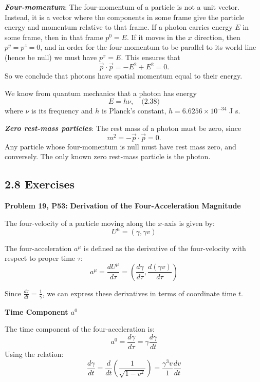 \documentclass[12pt]{book}
\begin{document}
        \textit{\textbf{Four-momentum}}:
        The four-momentum of a particle is not a unit vector. Instead, it is a vector where the components in some frame give the particle energy and momentum relative to that frame. If a photon carries energy \( E \) in some frame, then in that frame \( p^0 = E \). If it moves in the \( x \) direction, then \( p^y = p^z = 0 \), and in order for the four-momentum to be parallel to its world line (hence be null) we must have \( p^x = E \). This ensures that
        \[
        \vec{p} \cdot \vec{p} = -E^2 + E^2 = 0.
        \]
        So we conclude that photons have spatial momentum equal to their energy.
        
        We know from quantum mechanics that a photon has energy
        \[
        E = h\nu, \quad \text{(2.38)}
        \]
        where \( \nu \) is its frequency and \( h \) is Planck’s constant, \( h = 6.6256 \times 10^{-34} \) J s.

        \textit{\textbf{Zero rest-mass particles}}:
        The rest mass of a photon must be zero, since
        \[
        m^2 = -\vec{p} \cdot \vec{p} = 0.
        \]
        Any particle whose four-momentum is null must have rest mass zero, and conversely. The only known zero rest-mass particle is the photon.

        \subsection{2.8 Exercises}
        \textbf{Problem 19, P53:}
            \textbf{Derivation of the Four-Acceleration Magnitude}
            
            The four-velocity of a particle moving along the \( x \)-axis is given by:
            \[
            U^\mu = \left(\gamma, \gamma v\right)
            \]
                    
            The four-acceleration \( a^\mu \) is defined as the derivative of the four-velocity with respect to proper time \( \tau \):
            \[
            a^\mu = \frac{dU^\mu}{d\tau} = \left(\frac{d\gamma}{d\tau}, \frac{d(\gamma v)}{d\tau}\right)
            \]
            
            Since \( \frac{d\tau}{dt} = \frac{1}{\gamma} \), we can express these derivatives in terms of coordinate time \( t \).
            
            \textbf{Time Component \( a^0 \)}
            
            The time component of the four-acceleration is:
            \[
            a^0 = \frac{d\gamma}{d\tau} = \gamma \frac{d\gamma}{dt}
            \]
            Using the relation:
            \[
            \frac{d\gamma}{dt} = \frac{d}{dt} \left(\frac{1}{\sqrt{1 - v^2}}\right) = \frac{\gamma^3 v}{1} \frac{dv}{dt}
            \]
            
\end{document}
